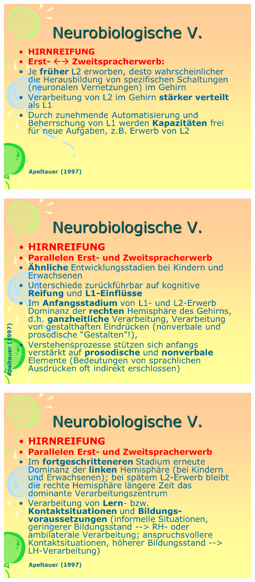 \documentclass[
  letterpaper,
]{scrbook}
\begin{document}
\includegraphics[width=1\textwidth,height=\textheight]{./pictures/neuro/Diapozitiv87.PNG}

\includegraphics[width=1\textwidth,height=\textheight]{./pictures/neuro/Diapozitiv88.PNG}

\includegraphics[width=1\textwidth,height=\textheight]{./pictures/neuro/Diapozitiv89.PNG}
\end{document}
